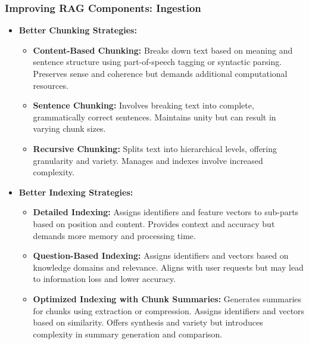 \begin{frame}[fragile]\frametitle{Improving RAG Components: Ingestion}
  \begin{itemize}
    \item \textbf{Better Chunking Strategies:}
      \begin{itemize}
        \item \textbf{Content-Based Chunking:} Breaks down text based on meaning and sentence structure using part-of-speech tagging or syntactic parsing. Preserves sense and coherence but demands additional computational resources.
        \item \textbf{Sentence Chunking:} Involves breaking text into complete, grammatically correct sentences. Maintains unity but can result in varying chunk sizes.
        \item \textbf{Recursive Chunking:} Splits text into hierarchical levels, offering granularity and variety. Manages and indexes involve increased complexity.
      \end{itemize}
    \item \textbf{Better Indexing Strategies:}
      \begin{itemize}
        \item \textbf{Detailed Indexing:} Assigns identifiers and feature vectors to sub-parts based on position and content. Provides context and accuracy but demands more memory and processing time.
        \item \textbf{Question-Based Indexing:} Assigns identifiers and vectors based on knowledge domains and relevance. Aligns with user requests but may lead to information loss and lower accuracy.
        \item \textbf{Optimized Indexing with Chunk Summaries:} Generates summaries for chunks using extraction or compression. Assigns identifiers and vectors based on similarity. Offers synthesis and variety but introduces complexity in summary generation and comparison.
      \end{itemize}
  \end{itemize}
\end{frame}


